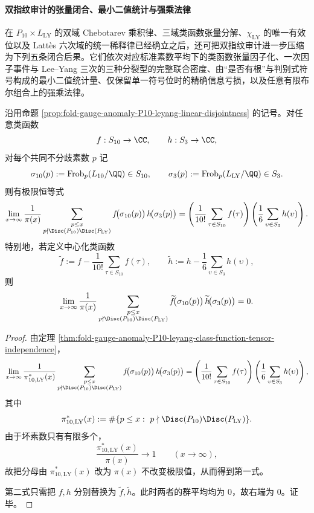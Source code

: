 \paragraph{双指纹审计的张量闭合、最小二值统计与强乘法律}
在 \(P_{10}\times L_{\mathrm{LY}}\) 的双域 Chebotarev 乘积律、三域类函数张量分解、\(\chi_{\mathrm{LY}}\) 的唯一有效位以及 Latt\`es 六次域的统一稀释律已经确立之后，还可把双指纹审计进一步压缩为下列五条闭合后果。它们依次对应标准素数平均下的类函数张量因子化、一次因子事件与 Lee--Yang 三次的三种分裂型的完整联合密度、由“是否有根”与判别式符号构成的最小二值统计量、仅保留单一符号位时的精确信息亏损，以及任意有限布尔组合上的强乘法律。

\begin{theorem}[标准素数平均下的双指纹类函数张量因子化]\label{thm:xi-time-part62ea-dualfingerprint-classfunction-prime-average-factorization}
沿用命题 \ref{prop:fold-gauge-anomaly-P10-leyang-linear-disjointness} 的记号。对任意类函数
\[
f:S_{10}\to\CC,
\qquad
h:S_3\to\CC,
\]
对每个共同不分歧素数 \(p\) 记
\[
\sigma_{10}(p):=\mathrm{Frob}_p(L_{10}/\QQ)\in S_{10},
\qquad
\sigma_3(p):=\mathrm{Frob}_p(L_{\mathrm{LY}}/\QQ)\in S_3.
\]
则有极限恒等式
\[
\lim_{x\to\infty}
\frac{1}{\pi(x)}
\sum_{\substack{p\le x\\ p\nmid \Disc(P_{10})\Disc(P_{\mathrm{LY}})}}
f\!\bigl(\sigma_{10}(p)\bigr)\,
h\!\bigl(\sigma_3(p)\bigr)
=
\left(\frac{1}{10!}\sum_{\tau\in S_{10}}f(\tau)\right)
\left(\frac{1}{6}\sum_{\upsilon\in S_3}h(\upsilon)\right).
\]
特别地，若定义中心化类函数
\[
\widetilde f:=
f-\frac{1}{10!}\sum_{\tau\in S_{10}}f(\tau),
\qquad
\widetilde h:=
h-\frac{1}{6}\sum_{\upsilon\in S_3}h(\upsilon),
\]
则
\[
\lim_{x\to\infty}
\frac{1}{\pi(x)}
\sum_{\substack{p\le x\\ p\nmid \Disc(P_{10})\Disc(P_{\mathrm{LY}})}}
\widetilde f\!\bigl(\sigma_{10}(p)\bigr)\,
\widetilde h\!\bigl(\sigma_3(p)\bigr)
=0.
\]
\end{theorem}
\begin{proof}
由定理 \ref{thm:fold-gauge-anomaly-P10-leyang-class-function-tensor-independence}，
\[
\lim_{x\to\infty}
\frac{1}{\pi_{10,\mathrm{LY}}^\ast(x)}
\sum_{\substack{p\le x\\ p\nmid \Disc(P_{10})\Disc(P_{\mathrm{LY}})}}
f\!\bigl(\sigma_{10}(p)\bigr)\,
h\!\bigl(\sigma_3(p)\bigr)
=
\left(\frac{1}{10!}\sum_{\tau\in S_{10}}f(\tau)\right)
\left(\frac{1}{6}\sum_{\upsilon\in S_3}h(\upsilon)\right),
\]
其中
\[
\pi_{10,\mathrm{LY}}^\ast(x):=
\#\{p\le x:\ p\nmid \Disc(P_{10})\Disc(P_{\mathrm{LY}})\}.
\]
由于坏素数只有有限多个，
\[
\frac{\pi_{10,\mathrm{LY}}^\ast(x)}{\pi(x)}\longrightarrow 1
\qquad(x\to\infty),
\]
故把分母由 \(\pi_{10,\mathrm{LY}}^\ast(x)\) 改为 \(\pi(x)\) 不改变极限值，从而得到第一式。

第二式只需把 \(f,h\) 分别替换为 \(\widetilde f,\widetilde h\)。此时两者的群平均均为 \(0\)，故右端为 \(0\)。证毕。
\end{proof}

